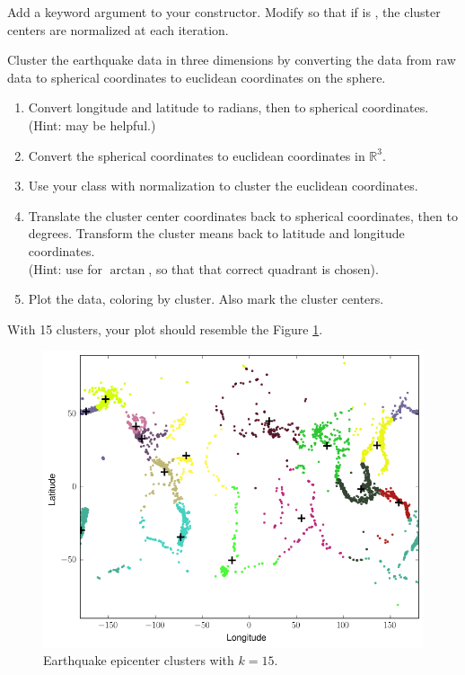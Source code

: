 \begin{problem}
Add a keyword argument  to your  constructor.
Modify  so that if  is , the cluster centers are normalized at each iteration.

Cluster the earthquake data in three dimensions by converting the data from raw data to spherical coordinates to euclidean coordinates on the sphere.
\begin{enumerate}
\item Convert longitude and latitude to radians, then to spherical coordinates.
\\(Hint:  may be helpful.)
\item Convert the spherical coordinates to euclidean coordinates in $\mathbb{R}^3$.
\item Use your  class with normalization to cluster the euclidean coordinates.
\item Translate the cluster center coordinates back to spherical coordinates, then to degrees.
Transform the cluster means back to latitude and longitude coordinates.
\\(Hint: use  for $\arctan$, so that that correct quadrant is chosen).
\item Plot the data, coloring by cluster.
Also mark the cluster centers.
\end{enumerate}
With 15 clusters, your plot should resemble the Figure \ref{fig:earthquakeclusters}.
\end{problem}

\begin{figure}[H]
    \centering
    \includegraphics[width=.7\textwidth]{earthquake_clusters.png}
    \caption{Earthquake epicenter clusters with $k = 15$.}
    \label{fig:earthquakeclusters}
\end{figure}

